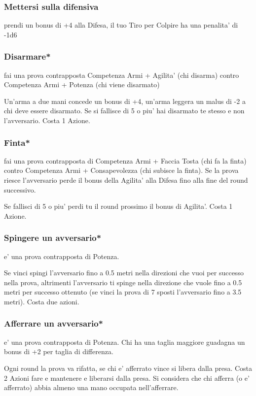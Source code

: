 \documentclass[a4paper,11pt,twoside,openany]{book}
\begin{document}
\subsubsection{Mettersi sulla difensiva} prendi un bonus di +4 alla Difesa, il tuo Tiro per Colpire ha una penalita' di -1d6

\subsubsection{Disarmare*} fai una prova contrapposta Competenza Armi + Agilita' (chi disarma) contro Competenza Armi + Potenza (chi viene disarmato)

Un'arma a due mani concede un bonus di +4, un'arma leggera un malus di -2 a chi deve essere disarmato. Se si fallisce di 5 o piu' hai disarmato te stesso e non l'avversario. Costa 1 Azione.

\subsubsection{Finta*} fai una prova contrapposta di Competenza Armi + Faccia Tosta (chi fa la finta) contro Competenza Armi + Consapevolezza (chi subisce la finta). Se la prova riesce l'avversario perde il bonus della Agilita' alla Difesa fino alla fine del round successivo.

Se fallisci di 5 o piu' perdi tu il round prossimo il bonus di Agilita'.
Costa 1 Azione.

\subsubsection{Spingere un avversario*} e' una prova contrapposta di Potenza.

Se vinci spingi l'avversario fino a 0.5 metri nella direzioni che vuoi per successo nella prova, altrimenti l'avversario ti spinge nella direzione che vuole fino a 0.5 metri per successo ottenuto (se vinci la prova di 7 sposti l'avversario fino a 3.5 metri).
Costa due azioni.

\subsubsection{Afferrare un avversario*} e' una prova contrapposta di Potenza. Chi ha una taglia maggiore guadagna un bonus di +2 per taglia di differenza.

Ogni round la prova va rifatta, se chi e' afferrato vince si libera dalla presa. Costa 2 Azioni fare e mantenere e liberarsi dalla presa. Si considera che chi afferra (o e' afferrato) abbia almeno una mano occupata nell'afferrare.
\end{document}
